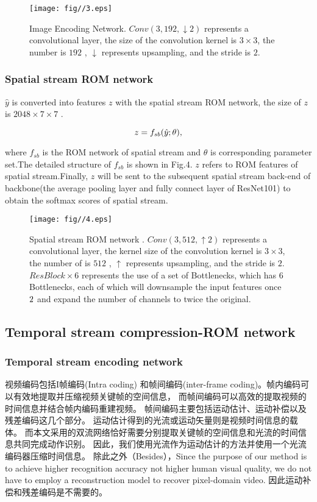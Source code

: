 \documentclass[a4paper]{cas-sc}
\begin{document}
\begin{figure}[ht]
	\centering
		\texttt{[image: fig//3.eps]}
	  \caption{Image Encoding Network. $Conv(3, 192 , \downarrow2)$ represents a convolutional layer, 
              the size of the convolution kernel is $3\times3$, the number is $192$ , $\downarrow$ represents upsampling, 
              and the stride is $2$. }\label{fig.3}
\end{figure}

\subsubsection{Spatial stream ROM network}
$\hat{y}$ is converted into features $z$ with the spatial stream ROM network, 
the size of $z$ is $2048\times7\times7$ .

\begin{equation}
  \centering
    z=f_{sb}(\hat{y};\theta ),
\end{equation}

where $f_{sb}$ is the ROM network of spatial stream and $\theta$ is corresponding parameter set.The detailed structure of  $f_{sb}$
is shown in Fig.4.
$z$ refers to ROM features of spatial stream.Finally, 
$z$ will be sent to the subsequent spatial stream back-end of backbone(the average pooling layer and fully connect layer of ResNet101) 
to obtain the softmax scores of spatial stream.

\begin{figure}[htb]
	\centering
		\texttt{[image: fig//4.eps]}
	  \caption{Spatial stream ROM network . 
            $Conv(3,512, \uparrow2)$ represents a convolutional layer, 
            the kernel size of the convolution kernel is $3\times3$, the number of is $512$ , 
            $\uparrow$ represents upsampling, and the stride is $2$. $ResBlock\times6$ represents the use of a set of Bottlenecks,
            which has $6$ Bottlenecks, each of which will downsample the input features once $\/2$ 
            and expand the number of channels to twice the original. }\label{fig.4}
\end{figure}

\subsection{Temporal stream compression-ROM network}
\subsubsection{Temporal stream encoding network}
视频编码包括I帧编码(Intra coding) 和帧间编码(inter-frame coding)。帧内编码可以有效地提取并压缩视频关键帧的空间信息，
而帧间编码可以高效的提取视频的时间信息并结合帧内编码重建视频。
帧间编码主要包括运动估计、运动补偿以及残差编码这几个部分。
运动估计得到的光流或运动矢量则是视频时间信息的载体。
而本文采用的双流网络恰好需要分别提取关键帧的空间信息和光流的时间信息共同完成动作识别。
因此，我们使用光流作为运动估计的方法并使用一个光流编码器压缩时间信息。
除此之外（Besides），Since the purpose
of our method is to achieve higher recognition accuracy not
higher human visual quality, we do not have to employ a
reconstruction model to recover pixel-domain video.
因此运动补偿和残差编码是不需要的。
\end{document}
